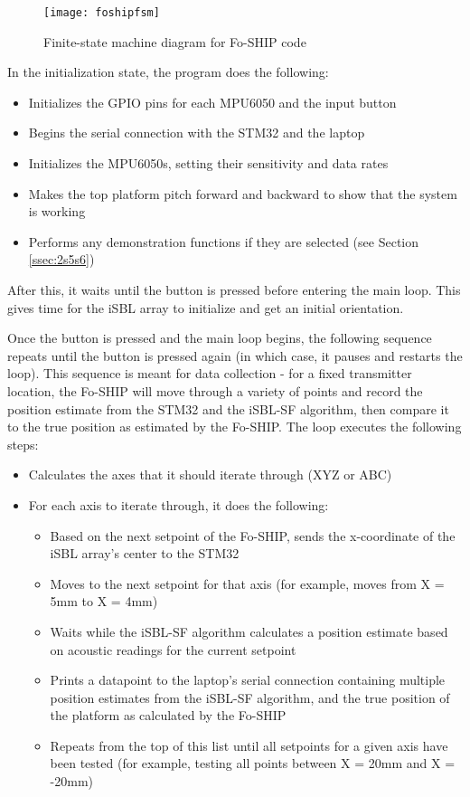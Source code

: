 \documentclass[12pt,a4paper]{report}
\begin{document}
\begin{figure}[htbp]
	\centering
	\texttt{[image: foshipfsm]}
	\caption{Finite-state machine diagram for Fo-SHIP code}
	\label{fig:foshipfsm}
\end{figure}

\noindent In the initialization state, the program does the following:

\begin{itemize}[noitemsep,topsep=0pt]
	\item Initializes the GPIO pins for each MPU6050 and the input button
	\item Begins the serial connection with the STM32 and the laptop
	\item Initializes the MPU6050s, setting their sensitivity and data rates
	\item Makes the top platform pitch forward and backward to show that the system is working
	\item Performs any demonstration functions if they are selected (see Section \ref{ssec:2s5s6})
\end{itemize}

After this, it waits until the button is pressed before entering the main loop. This gives time for the iSBL array to initialize and get an initial orientation.

Once the button is pressed and the main loop begins, the following sequence repeats until the button is pressed again (in which case, it pauses and restarts the loop). This sequence is meant for data collection - for a fixed transmitter location, the Fo-SHIP will move through a variety of points and record the position estimate from the STM32 and the iSBL-SF algorithm, then compare it to the true position as estimated by the Fo-SHIP. The loop executes the following steps:

\begin{itemize}[noitemsep,topsep=0pt]
	\item Calculates the axes that it should iterate through (XYZ or ABC)
	\item For each axis to iterate through, it does the following:
	
	\begin{itemize}[noitemsep,topsep=3ex]
		\item Based on the next setpoint of the Fo-SHIP, sends the x-coordinate of the iSBL array's center to the STM32
		\item Moves to the next setpoint for that axis (for example, moves from X = 5mm to X = 4mm)
		\item Waits while the iSBL-SF algorithm calculates a position estimate based on acoustic readings for the current setpoint
		\item Prints a datapoint to the laptop's serial connection containing multiple position estimates from the iSBL-SF algorithm, and the true position of the platform as calculated by the Fo-SHIP
		\item Repeats from the top of this list until all setpoints for a given axis have been tested (for example, testing all points between X = 20mm and X = -20mm)
	\end{itemize}
\end{itemize}
\end{document}
